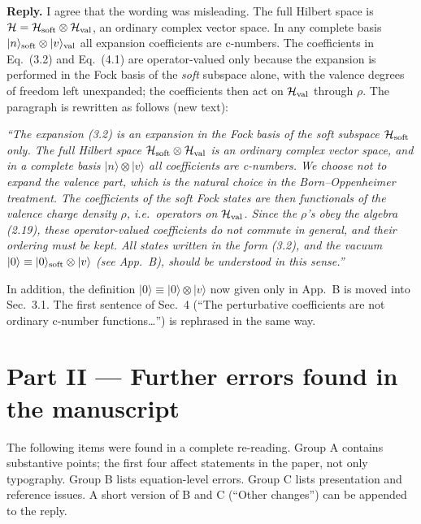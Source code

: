 \documentclass[11pt,a4paper]{article}
\newcommand{\eq}[1]{Eq.~(#1)}
\begin{document}
\textbf{Reply.} I agree that the wording was misleading. The full Hilbert space is $\mathcal H=\mathcal H_{\rm soft}\otimes\mathcal H_{\rm val}$, an ordinary complex vector space. In any complete basis $|n\rangle_{\rm soft}\otimes|v\rangle_{\rm val}$ all expansion coefficients are c-numbers. The coefficients in \eq{3.2} and \eq{4.1} are operator-valued only because the expansion is performed in the Fock basis of the \emph{soft} subspace alone, with the valence degrees of freedom left unexpanded; the coefficients then act on $\mathcal H_{\rm val}$ through $\rho$. The paragraph is rewritten as follows (new text):

\begin{changes}
\textit{``The expansion (3.2) is an expansion in the Fock basis of the soft subspace $\mathcal H_{\rm soft}$ only. The full Hilbert space $\mathcal H_{\rm soft}\otimes\mathcal H_{\rm val}$ is an ordinary complex vector space, and in a complete basis $|n\rangle\otimes|v\rangle$ all coefficients are c-numbers. We choose not to expand the valence part, which is the natural choice in the Born--Oppenheimer treatment. The coefficients of the soft Fock states are then functionals of the valence charge density $\rho$, i.e.\ operators on $\mathcal H_{\rm val}$. Since the $\rho$'s obey the algebra (2.19), these operator-valued coefficients do not commute in general, and their ordering must be kept. All states written in the form (3.2), and the vacuum $|0\rangle\equiv|0\rangle_{\rm soft}\otimes|v\rangle$ (see App.~B), should be understood in this sense.''}

\medskip
In addition, the definition $|0\rangle\equiv|0\rangle\otimes|v\rangle$ now given only in App.~B is moved into Sec.~3.1. The first sentence of Sec.~4 (``The perturbative coefficients are not ordinary c-number functions\ldots'') is rephrased in the same way.
\end{changes}

\section*{Part II --- Further errors found in the manuscript}

The following items were found in a complete re-reading. Group A contains substantive points; the first four affect statements in the paper, not only typography. Group B lists equation-level errors. Group C lists presentation and reference issues. A short version of B and C (``Other changes'') can be appended to the reply.
\end{document}
